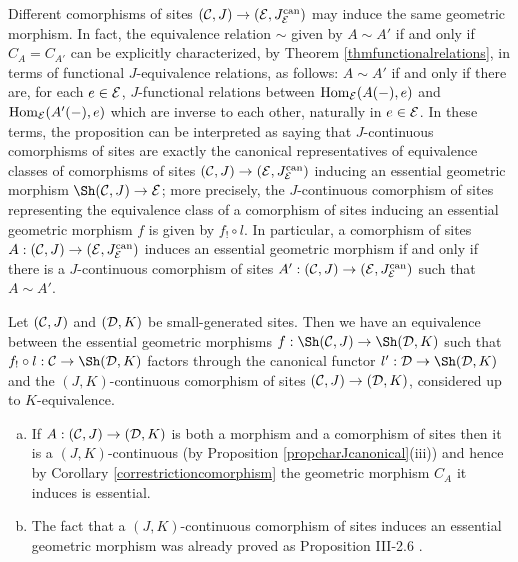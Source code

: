 \documentclass[a4paper,12pt]{article}
\begin{document}
\begin{remark}\label{remdiffcomorphisms}
	Different comorphisms of sites $({\cal C}, J) \to ({\cal E}, J^{\textup{can}}_{\cal E})$ may induce the same geometric morphism. In fact, the equivalence relation $\sim$  given by $A\sim A'$ if and only if $C_{A}=C_{A'}$ can be explicitly characterized, by Theorem \ref{thmfunctionalrelations}, in terms of functional $J$-equivalence relations, as follows: $A\sim A'$ if and only if there are, for each $e\in {\cal E}$, $J$-functional relations between $\textup{Hom}_{\cal E}(A(-), e)$ and $\textup{Hom}_{\cal E}(A'(-), e)$ which are inverse to each other, naturally in $e\in {\cal E}$. In these terms, the proposition can be interpreted as saying that $J$-continuous comorphisms of sites are exactly the canonical representatives of equivalence classes of comorphisms of sites $({\cal C}, J)\to ({\cal E}, J^{\textup{can}}_{\cal E})$ inducing an essential geometric morphism $\Sh({\cal C}, J) \to {\cal E}$; more precisely, the $J$-continuous comorphism of sites representing the equivalence class of a comorphism of sites inducing an essential geometric morphism $f$ is given by $f_{!}\circ l$. In particular, a comorphism of sites $A:({\cal C}, J) \to ({\cal E}, J^{\textup{can}}_{\cal E})$ induces an essential geometric morphism if and only if there is a $J$-continuous comorphism of sites $A':({\cal C}, J) \to ({\cal E}, J^{\textup{can}}_{\cal E})$ such that $A\sim A'$. 
\end{remark}

\begin{corollary}\label{correstrictioncomorphism}
	Let $({\cal C}, J)$ and $({\cal D}, K)$ be small-generated sites. Then we have an equivalence between the essential geometric morphisms $f:\Sh({\cal C}, J)\to \Sh({\cal D}, K)$ such that $f_{!}\circ l:{\cal C}\to \Sh({\cal D}, K)$ factors through the canonical functor $l':{\cal D}\to \Sh({\cal D}, K)$ and the $(J, K)$-continuous comorphism of sites $({\cal C}, J) \to ({\cal D}, K)$, considered up to $K$-equivalence. 
\end{corollary}

\begin{remarks}
	
	\begin{enumerate}[(a)]
		\item If $A:({\cal C}, J)\to ({\cal D}, K)$ is both a morphism and a comorphism of sites then it is a $(J, K)$-continuous (by Proposition \ref{propcharJcanonical}(iii)) and hence by Corollary \ref{correstrictioncomorphism} the geometric morphism $C_{A}$ it induces is essential.
		
		\item The fact that a $(J, K)$-continuous comorphism of sites induces an essential geometric morphism was already proved as Proposition III-2.6 \cite{grothendieck}.
	\end{enumerate}

	
	 
\end{remarks}
\end{document}
